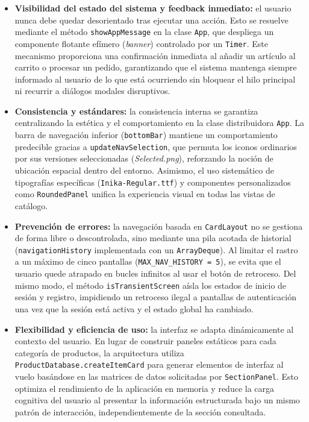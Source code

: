 \documentclass[12pt,a4paper]{article}
\begin{document}
\begin{itemize}
	\item \textbf{Visibilidad del estado del sistema y feedback inmediato:} el usuario nunca debe quedar desorientado tras ejecutar una acción. Esto se resuelve mediante el método \texttt{showAppMessage} en la clase \texttt{App}, que despliega un componente flotante efímero (\textit{banner}) controlado por un \texttt{Timer}. Este mecanismo proporciona una confirmación inmediata al añadir un artículo al carrito o procesar un pedido, garantizando que el sistema mantenga siempre informado al usuario de lo que está ocurriendo sin bloquear el hilo principal ni recurrir a diálogos modales disruptivos.
	\item \textbf{Consistencia y estándares:} la consistencia interna se garantiza centralizando la estética y el comportamiento en la clase distribuidora \texttt{App}. La barra de navegación inferior (\texttt{bottomBar}) mantiene un comportamiento predecible gracias a \texttt{updateNavSelection}, que permuta los iconos ordinarios por sus versiones seleccionadas (\textit{Selected.png}), reforzando la noción de ubicación espacial dentro del entorno. Asimismo, el uso sistemático de tipografías específicas (\texttt{Inika-Regular.ttf}) y componentes personalizados como \texttt{RoundedPanel} unifica la experiencia visual en todas las vistas de catálogo.
	\item \textbf{Prevención de errores:} la navegación basada en \texttt{CardLayout} no se gestiona de forma libre o descontrolada, sino mediante una pila acotada de historial (\texttt{navigationHistory} implementada con un \texttt{ArrayDeque}). Al limitar el rastro a un máximo de cinco pantallas (\texttt{MAX\_NAV\_HISTORY = 5}), se evita que el usuario quede atrapado en bucles infinitos al usar el botón de retroceso. Del mismo modo, el método \texttt{isTransientScreen} aísla los estados de inicio de sesión y registro, impidiendo un retroceso ilegal a pantallas de autenticación una vez que la sesión está activa y el estado global ha cambiado.
	\item \textbf{Flexibilidad y eficiencia de uso:} la interfaz se adapta dinámicamente al contexto del usuario. En lugar de construir paneles estáticos para cada categoría de productos, la arquitectura utiliza \texttt{ProductDatabase.createItemCard} para generar elementos de interfaz al vuelo basándose en las matrices de datos solicitadas por \texttt{SectionPanel}. Esto optimiza el rendimiento de la aplicación en memoria y reduce la carga cognitiva del usuario al presentar la información estructurada bajo un mismo patrón de interacción, independientemente de la sección consultada.
\end{itemize}
\end{document}
